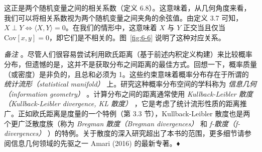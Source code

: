 这正是两个随机变量之间的相关系数（定义 6.8）。这意味着，从几何角度来看，我们可以将相关系数视为两个随机变量之间夹角的余弦值。由定义 3.7 可知，$ X \perp Y \iff \langle X, Y \rangle = 0 $。在我们的情形中，这意味着 $ X $ 与 $ Y $ 正交当且仅当 $ \mathrm{Cov}[x, y] = 0 $，即它们是不相关的。图~\ref{fig:6-6} 说明了这种对应关系。

\emph{备注} 。尽管人们很容易尝试利用欧氏距离（基于前述内积定义构建）来比较概率分布，但遗憾的是，这并不是获取分布之间距离的最佳方式。回想一下，概率质量（或密度）是非负的，且总和必须为 1。这些约束意味着概率分布存在于所谓的 \emph{统计流形（statistical manifold）} 上。研究这种概率分布空间的学科称为 \emph{信息几何（information geometry）} 。计算分布之间的距离通常使用 \emph{Kullback-Leibler 散度（Kullback-Leibler divergence, KL 散度）} ，它是考虑了统计流形性质的距离推广。正如欧氏距离是度量的一个特例（第 3.3 节），Kullback-Leibler 散度也是两个更广泛散度族（称为 \emph{Bregman 散度（Bregman divergences）} 和 \emph{f-散度（f-divergences）} ）的特例。关于散度的深入研究超出了本书的范围，更多细节请参阅信息几何领域的先驱之一 Amari (2016) 的最新专著。♦
